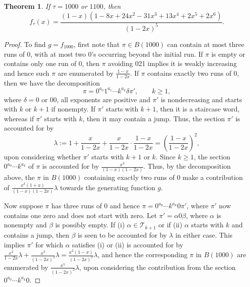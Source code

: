 \documentclass{article}
\theoremstyle{remark}
\theoremstyle{plain}
\newtheorem{theorem}{Theorem}[section]
\begin{document}
\begin{theorem}\label{1000th}
If $\tau=1000$ or $1100$, then
\begin{equation}\label{1000the1}
f_\tau(x)=\frac{(1-x)(1-8x+24x^2-31x^3+13x^4+2x^5+2x^6)}{(1-2x)^5}.
\end{equation}
\end{theorem}
\begin{proof}
To find $g=f_{1000}$, first note that $\pi \in B(1000)$ can contain at most three runs of 0, with at most two 0's occurring beyond the initial run.  If $\pi$ is empty or contains only one run of 0, then $\pi$ avoiding 021 implies it is weakly increasing and hence such $\pi$ are enumerated by $\frac{1-x}{1-2x}$.  If $\pi$ contains exactly two runs of 0, then we have the decomposition
$$\pi=0^{a_0}1^{a_1}\cdots k^{a_k}\delta\pi', \qquad k \geq 1,$$
where $\delta=0$ or $00$, all exponents are positive and $\pi'$ is nondecreasing and starts with $k$ or $k+1$ if nonempty.  If $\pi'$ starts with $k+1$, then it is a staircase word, whereas if $\pi'$ starts with $k$, then it may contain a jump.  Thus, the section $\pi'$ is accounted for by
$$\lambda:=1+\frac{x}{1-2x}+\frac{x}{1-2x}\cdot\frac{1-x}{1-2x}=\left(\frac{1-x}{1-2x}\right)^2,$$
upon considering whether $\pi'$ starts with $k+1$ or $k$.  Since $k \geq 1$, the section $0^{a_0}\cdots k^{a_k}$ of $\pi$ is accounted for by $\frac{x^2}{(1-x)(1-2x)}$.  Thus, by the decomposition above, the $\pi$ in $B(1000)$ containing exactly two runs of 0 make a contribution of $\frac{x^3(1+x)}{(1-x)(1-2x)}\lambda$ towards the generating function $g$.

Now suppose $\pi$ has three runs of 0 and hence $\pi=0^{a_0}\cdots k^{a_k}0\pi'$, where $\pi'$ now contains one zero and does not start with zero.  Let $\pi'=\alpha0\beta$, where $\alpha$ is nonempty and $\beta$ is possibly empty.  If (i) $\alpha \in \mathcal{T}_{k+1}$ or if (ii) $\alpha$ starts with $k$ and contains a jump, then $\beta$ is seen to be accounted for by $\lambda$ in either case.  This implies $\pi'$ for which $\alpha$ satisfies (i) or (ii) is accounted for by $\frac{x^2}{1-2x}\lambda+\frac{x^3}{(1-2x)^2}\lambda=\frac{x^2(1-x)}{(1-2x)^2}\lambda$, and hence the corresponding $\pi$ in $B(1000)$ are enumerated by $\frac{x^5}{(1-2x)^3}\lambda$, upon considering the contribution from the section $0^{a_0}\cdots k^{a_k}0$.


\end{proof}
\end{document}
